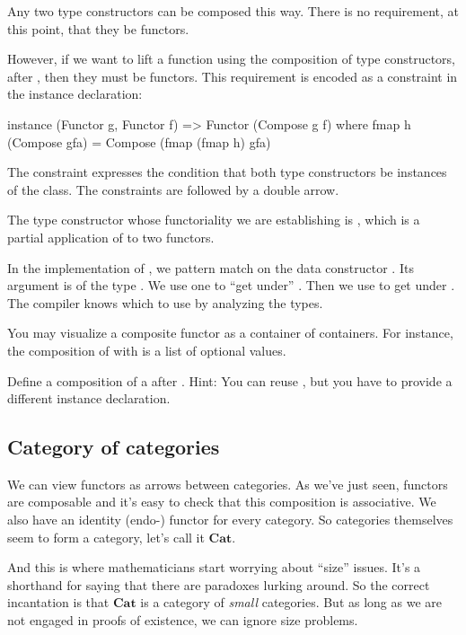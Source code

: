 \documentclass[DaoFP]{subfiles}
\begin{document}
Any two type constructors can be composed this way. There is no requirement, at this point, that they be functors. 

However, if we want to lift a function using the composition of type constructors,  after , then they must be functors. This requirement is encoded as a constraint in the instance declaration:
\begin{haskell}
instance (Functor g, Functor f) => Functor (Compose g f) where
  fmap h (Compose gfa) = Compose (fmap (fmap h) gfa)
\end{haskell}
The constraint  expresses the condition that both type constructors be instances of the  class. The constraints are followed by a double arrow. 

The type constructor whose functoriality we are establishing is , which is a partial application of  to two functors. 

In the implementation of , we pattern match on the data constructor . Its argument  is of the type . We use one  to ``get under'' . Then we use  to get under . The compiler knows which  to use by analyzing the types. 

You may visualize a composite functor as a container of containers. For instance, the composition of \hask{[]} with  is a list of optional values. 

\begin{exercise}
Define a composition of a  after . Hint: You can reuse , but you have to provide a different instance declaration.
\end{exercise}


\subsection{Category of categories}

We can view functors as arrows between categories. As we've just seen, functors are composable and it's easy to check that this composition is associative. We also have an identity (endo-) functor for every category. So categories themselves seem to form a category, let's call it $\mathbf{Cat}$. 

And this is where mathematicians start worrying about ``size'' issues. It's a shorthand for saying that there are paradoxes lurking around. So the correct incantation is that $\mathbf{Cat}$ is a category of \emph{small} categories. But as long as we are not engaged in proofs of existence, we can ignore size problems.
\end{document}

